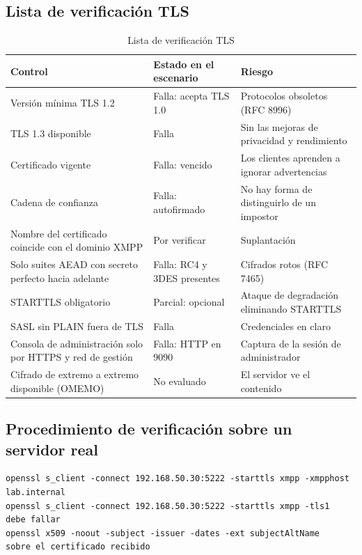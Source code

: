 \subsection{Lista de verificación TLS}

\begin{table}[H]
\centering
\small
\caption[Lista de verificación TLS (tabla 1)]{Lista de verificación TLS}
\begin{tabularx}{\linewidth}{>{\raggedright\arraybackslash}X >{\raggedright\arraybackslash}X >{\raggedright\arraybackslash}X}
\toprule
\textbf{Control} & \textbf{Estado en el escenario} & \textbf{Riesgo} \\
\midrule
Versión mínima TLS 1.2 & Falla: acepta TLS 1.0 & Protocolos obsoletos (RFC 8996) \\
TLS 1.3 disponible & Falla & Sin las mejoras de privacidad y rendimiento \\
Certificado vigente & Falla: vencido & Los clientes aprenden a ignorar advertencias \\
Cadena de confianza & Falla: autofirmado & No hay forma de distinguirlo de un impostor \\
Nombre del certificado coincide con el dominio XMPP & Por verificar & Suplantación \\
Solo suites AEAD con secreto perfecto hacia adelante & Falla: RC4 y 3DES presentes & Cifrados rotos (RFC 7465) \\
STARTTLS obligatorio & Parcial: opcional & Ataque de degradación eliminando STARTTLS \\
SASL sin PLAIN fuera de TLS & Falla & Credenciales en claro \\
Consola de administración solo por HTTPS y red de gestión & Falla: HTTP en 9090 & Captura de la sesión de administrador \\
Cifrado de extremo a extremo disponible (OMEMO) & No evaluado & El servidor ve el contenido \\
\bottomrule
\end{tabularx}
\end{table}

\subsection{Procedimiento de verificación sobre un servidor real}

\begin{lstlisting}
openssl s_client -connect 192.168.50.30:5222 -starttls xmpp -xmpphost lab.internal
openssl s_client -connect 192.168.50.30:5222 -starttls xmpp -tls1      debe fallar
openssl x509 -noout -subject -issuer -dates -ext subjectAltName         sobre el certificado recibido
\end{lstlisting}

